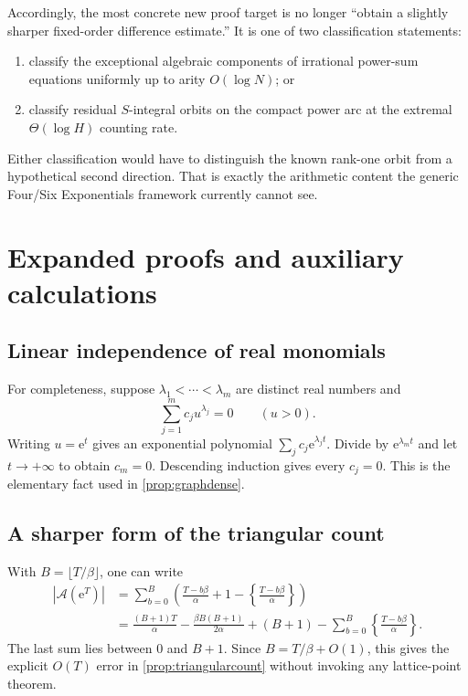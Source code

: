 \documentclass[11pt,oneside]{article}
\theoremstyle{definition}
\newcommand{\ee}{\mathrm{e}}
\newcommand{\cA}{\mathscr{A}}
\begin{document}
Accordingly, the most concrete new proof target is no longer ``obtain a slightly sharper fixed-order difference estimate.''  It is one of two classification statements:
\begin{enumerate}
\item classify the exceptional algebraic components of irrational power-sum equations uniformly up to arity $O(\log N)$; or
\item classify residual $S$-integral orbits on the compact power arc at the extremal $\Theta(\log H)$ counting rate.
\end{enumerate}
Either classification would have to distinguish the known rank-one orbit from a hypothetical second direction.  That is exactly the arithmetic content the generic Four/Six Exponentials framework currently cannot see.

\appendix

\section{Expanded proofs and auxiliary calculations}

\subsection{Linear independence of real monomials}

For completeness, suppose $\lambda_1<\cdots<\lambda_m$ are distinct real numbers and
\[
       \sum_{j=1}^m c_j u^{\lambda_j}=0
       \qquad(u>0).
\]
Writing $u=\ee^t$ gives an exponential polynomial
$\sum_jc_j\ee^{\lambda_jt}$.  Divide by $\ee^{\lambda_mt}$ and let
$t\to+\infty$ to obtain $c_m=0$.  Descending induction gives every
$c_j=0$.  This is the elementary fact used in \cref{prop:graphdense}.

\subsection{A sharper form of the triangular count}

With $B=\lfloor T/\beta\rfloor$, one can write
\begin{align*}
 |\cA(\ee^T)|
 &=\sum_{b=0}^{B}
   \left(\frac{T-b\beta}{\alpha}+1
          -\left\{\frac{T-b\beta}{\alpha}\right\}\right)\\
 &=\frac{(B+1)T}{\alpha}
   -\frac{\beta B(B+1)}{2\alpha}
   +(B+1)
   -\sum_{b=0}^{B}
      \left\{\frac{T-b\beta}{\alpha}\right\}.
\end{align*}
The last sum lies between $0$ and $B+1$.  Since
$B=T/\beta+O(1)$, this gives the explicit $O(T)$ error in
\cref{prop:triangularcount} without invoking any lattice-point theorem.
\end{document}
